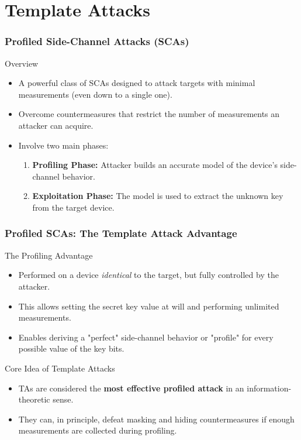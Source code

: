 \section{Template Attacks} 
\begin{frame}
    \frametitle{Profiled Side-Channel Attacks (SCAs)}
    \begin{block}{Overview}
        \begin{itemize}
            \item A powerful class of SCAs designed to attack targets with minimal measurements (even down to a single one).
            \item Overcome countermeasures that restrict the number of measurements an attacker can acquire.
            \item Involve two main phases:
                \begin{enumerate}
                    \item \textbf{Profiling Phase:} Attacker builds an accurate model of the device's side-channel behavior.
                    \item \textbf{Exploitation Phase:} The model is used to extract the unknown key from the target device.
                \end{enumerate}
        \end{itemize}
    \end{block}
\end{frame}


\begin{frame}
    \frametitle{Profiled SCAs: The Template Attack Advantage} %
    \begin{block}{The Profiling Advantage}
        \begin{itemize}
            \item Performed on a device \textit{identical} to the target, but fully controlled by the attacker.
            \item This allows setting the secret key value at will and performing unlimited measurements.
            \item Enables deriving a "perfect" side-channel behavior or "profile" for every possible value of the key bits.
        \end{itemize}
    \end{block}
    \begin{block}{Core Idea of Template Attacks}
        \begin{itemize}
            \item TAs are considered the \textbf{most effective profiled attack }in an information-theoretic sense.
            \item They can, in principle, defeat masking and hiding countermeasures if enough measurements are collected during profiling.
        \end{itemize}
    \end{block}
\end{frame}



